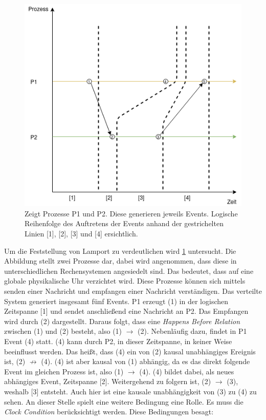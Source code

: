 \begin{figure}[!ht]
	\centering
	\includegraphics[scale=0.5]{img/synchronisation/PartialOrdering_ChildO.png}
	\caption[Partielle Ordnung von nebenläufigen Events]{Zeigt Prozesse P1 und P2. Diese generieren jeweils Events. Logische Reihenfolge des Auftretens der Events anhand der gestrichelten Linien [1], [2], [3] und [4] ersichtlich.}
	\label{fig:Partial_Ordering_Concurrent}
\end{figure}

Um die Feststellung von Lamport zu verdeutlichen wird \cref{fig:Partial_Ordering_Concurrent} untersucht. Die Abbildung stellt zwei Prozesse dar, dabei wird angenommen, dass diese in unterschiedlichen Rechensystemen angesiedelt sind. Das bedeutet, dass auf eine globale physikalische Uhr verzichtet wird. Diese Prozesse können sich mittels senden einer Nachricht und empfangen einer Nachricht verständigen. Das verteilte System generiert insgesamt fünf Events. P1 erzeugt (1) in der logischen Zeitspanne [1] und sendet anschließend eine Nachricht an P2. Das Empfangen wird durch (2) dargestellt. Daraus folgt, dass eine \emph{Happens Before Relation} zwischen (1) und (2) besteht, also (1) $\rightarrow$ (2). Nebenläufig dazu, findet in P1 Event (4) statt. (4) kann durch P2, in dieser Zeitspanne, in keiner Weise beeinflusst werden. Das heißt, dass (4) ein von (2)  kausal unabhängiges Ereignis ist, (2) $\not\rightarrow$ (4). (4) ist aber kausal von (1) abhängig, da es das direkt folgende Event im gleichen Prozess ist, also (1) $\rightarrow$ (4). (4) bildet dabei, als neues abhängiges Event, Zeitspanne [2]. Weitergehend zu folgern ist, (2) $\rightarrow$ (3), weshalb [3] entsteht. Auch hier ist eine kausale unabhängigkeit von (3) zu (4) zu sehen. An dieser Stelle spielt eine weitere Bedingung eine Rolle. Es muss die \emph{Clock Condition} berücksichtigt werden. Diese Bedingungen besagt:

